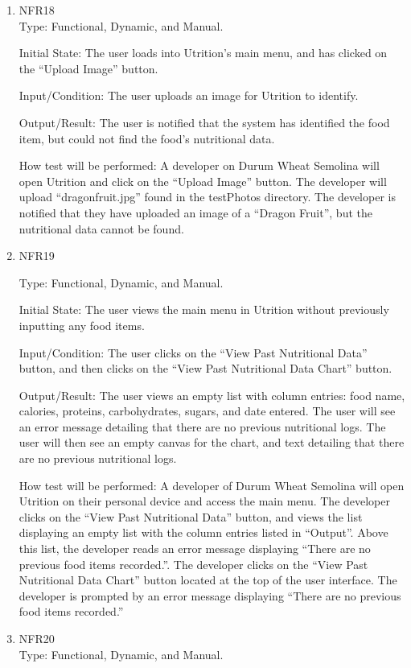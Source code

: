 \documentclass[12pt, titlepage]{article}
\begin{document}
\begin{enumerate}
		\item{NFR18\\} 
		Type: Functional, Dynamic, and Manual.
		
		Initial State: The user loads into Utrition’s main menu, and has clicked on the “Upload Image” button.
		
		Input/Condition: The user uploads an image for Utrition to identify.
		
		Output/Result: The user is notified that the system has identified the food item, but could not find the food’s nutritional data.
		
		How test will be performed: A developer on Durum Wheat Semolina will open Utrition and click on the “Upload Image” button. The developer will upload “dragonfruit.jpg” found in the testPhotos directory. The developer is notified that they have uploaded an image of a “Dragon Fruit”, but the nutritional data cannot be found.
		
		\item{NFR19\\} 
		
		Type: Functional, Dynamic, and Manual.
		
		Initial State: The user views the main menu in Utrition without previously inputting any food items.
		
		Input/Condition: The user clicks on the “View Past Nutritional Data” button, and then clicks on the “View Past Nutritional Data Chart” button.
		
		Output/Result: The user views an empty list with column entries: food name, calories, proteins, carbohydrates, sugars, and date entered. The user will see an error message detailing that there are no previous nutritional logs. The user will then see an empty canvas for the chart, and text detailing that there are no previous nutritional logs.
		
		How test will be performed: A developer of Durum Wheat Semolina will open Utrition on their personal device and access the main menu. The developer clicks on the “View Past Nutritional Data” button, and views the list displaying an empty list with the column entries listed in “Output”. Above this list, the developer reads an error message displaying “There are no previous food items recorded.”. The developer clicks on the “View Past Nutritional Data Chart” button located at the top of the user interface. The developer is prompted by an error message displaying “There are no previous food items recorded.”
		
		\item{NFR20\\}
		Type: Functional, Dynamic, and Manual.
		

\end{enumerate}
\end{document}
